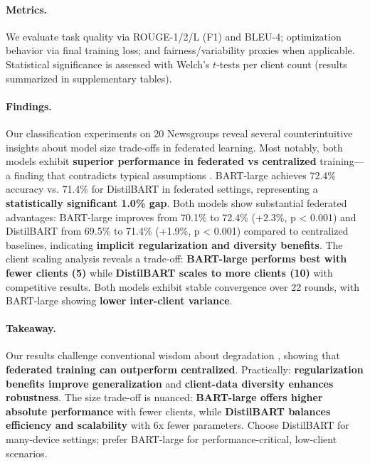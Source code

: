 \documentclass[conference]{IEEEtran}
\begin{document}
\paragraph{Metrics.} We evaluate task quality via ROUGE-1/2/L (F1) and BLEU-4; optimization behavior via final training loss; and fairness/variability proxies when applicable. Statistical significance is assessed with Welch's $t$-tests per client count (results summarized in supplementary tables).
\cite{lin2004rouge,papineni2002bleu,welch1947}

\paragraph{Findings.} Our classification experiments on 20 Newsgroups reveal several counterintuitive insights about model size trade-offs in federated learning. Most notably, both models exhibit \textbf{superior performance in federated vs centralized} training—a finding that contradicts typical assumptions \cite{li2020federated}. BART-large achieves 72.4\% accuracy vs. 71.4\% for DistilBART in federated settings, representing a \textbf{statistically significant 1.0\% gap}. Both models show substantial federated advantages: BART-large improves from 70.1\% to 72.4\% (+2.3\%, p < 0.001) and DistilBART from 69.5\% to 71.4\% (+1.9\%, p < 0.001) compared to centralized baselines, indicating \textbf{implicit regularization and diversity benefits}. The client scaling analysis reveals a trade-off: \textbf{BART-large performs best with fewer clients (5)} while \textbf{DistilBART scales to more clients (10)} with competitive results. Both models exhibit stable convergence over 22 rounds, with BART-large showing \textbf{lower inter-client variance}.

\paragraph{Takeaway.} Our results challenge conventional wisdom about degradation \cite{zhao2018federated}, showing that \textbf{federated training can outperform centralized}. Practically: \textbf{regularization benefits improve generalization} and \textbf{client-data diversity enhances robustness}. The size trade-off is nuanced: \textbf{BART-large offers higher absolute performance} with fewer clients, while \textbf{DistilBART balances efficiency and scalability} with 6x fewer parameters. Choose DistilBART for many-device settings; prefer BART-large for performance-critical, low-client scenarios.
\end{document}
